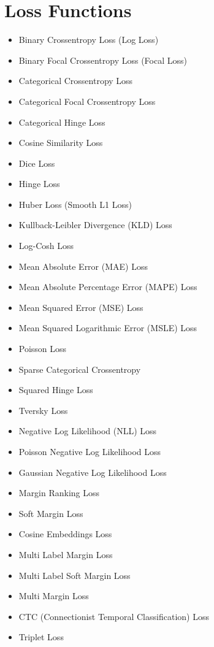 \section{Loss Functions}

\begin{itemize}
    \item Binary Crossentropy Loss (Log Loss)
    \item Binary Focal Crossentropy Loss (Focal Loss)
    \item Categorical Crossentropy Loss
    \item Categorical Focal Crossentropy Loss
    \item Categorical Hinge Loss
    \item Cosine Similarity Loss
    \item Dice Loss
    \item Hinge Loss
    \item Huber Loss (Smooth L1 Loss)
    \item Kullback-Leibler Divergence (KLD) Loss
    \item Log-Cosh Loss
    \item Mean Absolute Error (MAE) Loss
    \item Mean Absolute Percentage Error (MAPE) Loss
    \item Mean Squared Error (MSE) Loss
    \item Mean Squared Logarithmic Error (MSLE) Loss
    \item Poisson Loss
    \item Sparse Categorical Crossentropy
    \item Squared Hinge Loss
    \item Tversky Loss
    \item Negative Log Likelihood (NLL) Loss
    \item Poisson Negative Log Likelihood Loss
    \item Gaussian Negative Log Likelihood Loss
    \item Margin Ranking Loss
    \item Soft Margin Loss
    \item Cosine Embeddings Loss
    \item Multi Label Margin Loss
    \item Multi Label Soft Margin Loss
    \item Multi Margin Loss
    \item CTC (Connectionist Temporal Classification) Loss
    \item Triplet Loss
\end{itemize}

